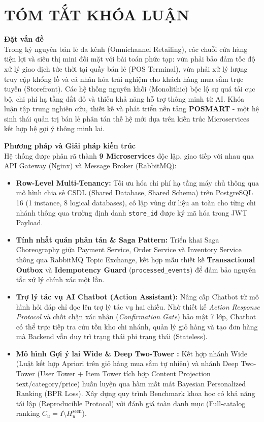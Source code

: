 \documentclass[12pt,a4paper]{report}
\begin{document}
\newpage
\chapter*{TÓM TẮT KHÓA LUẬN}

\textbf{Đặt vấn đề}\\
Trong kỷ nguyên bán lẻ đa kênh (Omnichannel Retailing), các chuỗi cửa hàng tiện lợi và siêu thị mini đối mặt với bài toán phức tạp: vừa phải bảo đảm tốc độ xử lý giao dịch tức thời tại quầy bán lẻ (POS Terminal), vừa phải xử lý lượng truy cập khổng lồ và cá nhân hóa trải nghiệm cho khách hàng mua sắm trực tuyến (Storefront). Các hệ thống nguyên khối (Monolithic) bộc lộ sự quá tải cục bộ, chi phí hạ tầng đắt đỏ và thiếu khả năng hỗ trợ thông minh từ AI. Khóa luận tập trung nghiên cứu, thiết kế và phát triển nền tảng \textbf{POSMART} - một hệ sinh thái quản trị bán lẻ phân tán thế hệ mới dựa trên kiến trúc Microservices kết hợp hệ gợi ý thông minh lai.

\vspace{0.4cm}
\textbf{Phương pháp và Giải pháp kiến trúc}\\
Hệ thống được phân rã thành \textbf{9 Microservices} độc lập, giao tiếp với nhau qua API Gateway (Nginx) và Message Broker (RabbitMQ):
\begin{itemize}[leftmargin=1.5cm]
    \item \textbf{Row-Level Multi-Tenancy:} Tối ưu hóa chi phí hạ tầng máy chủ thông qua mô hình chia sẻ CSDL (Shared Database, Shared Schema) trên PostgreSQL 16 (1 instance, 8 logical databases), cô lập vùng dữ liệu an toàn cho từng chi nhánh thông qua trường định danh \texttt{store\_id} được ký mã hóa trong JWT Payload.
    \item \textbf{Tính nhất quán phân tán \& Saga Pattern:} Triển khai Saga Choreography giữa Payment Service, Order Service và Inventory Service thông qua RabbitMQ Topic Exchange, kết hợp mẫu thiết kế \textbf{Transactional Outbox} và \textbf{Idempotency Guard} (\texttt{processed\_events}) để đảm bảo nguyên tắc xử lý chính xác một lần.
    \item \textbf{Trợ lý tác vụ AI Chatbot (Action Assistant):} Nâng cấp Chatbot từ mô hình hỏi đáp chỉ đọc lên trợ lý tác vụ hai chiều. Nhờ thiết kế \textit{Action Response Protocol} và chốt chặn xác nhận (\textit{Confirmation Gate}) bảo mật 7 lớp, Chatbot có thể trực tiếp tra cứu tồn kho chi nhánh, quản lý giỏ hàng và tạo đơn hàng mà Backend vẫn duy trì trạng thái phi trạng thái (Stateless).
    \item \textbf{Mô hình Gợi ý lai Wide \& Deep Two-Tower :} Kết hợp nhánh Wide (Luật kết hợp Apriori trên giỏ hàng mua sắm tự nhiên) và nhánh Deep Two-Tower (User Tower + Item Tower tích hợp Content Projection text/category/price) huấn luyện qua hàm mất mát Bayesian Personalized Ranking (BPR Loss). Xây dựng quy trình Benchmark khoa học có khả năng tái lập (Reproducible Protocol) với đánh giá toàn danh mục (Full-catalog ranking $C_u = I \setminus H_u^{\text{seen}}$).
\end{itemize}
\end{document}
